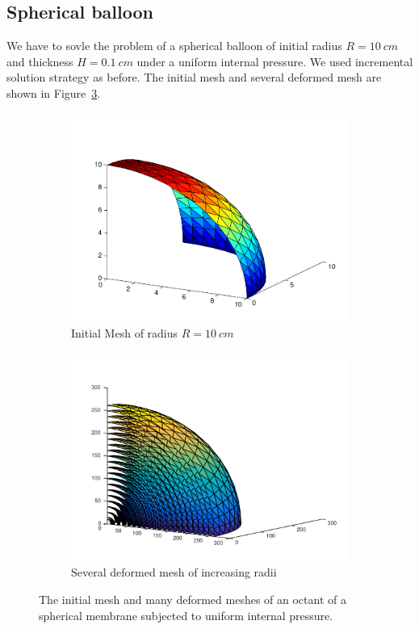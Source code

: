 \documentclass[../main.tex]{subfiles}
\begin{document}
\subsection{Spherical balloon}
We have to sovle the problem of a spherical balloon of initial radius
$R=10\ cm$ and thickness $H = 0.1\ cm$ under a uniform internal
pressure. We used incremental solution strategy as before. The initial
mesh and several deformed mesh are shown in
Figure~\ref{fig:balloonMesh}.
\begin{figure}[ht]
  \centering
  \begin{subfigure}[b]{0.5\textwidth}
    \includegraphics[scale=0.5]{./img/balloon.pdf}
    \caption{Initial Mesh of radius $R=10\ cm$}
    \label{fig:initialBalloon}
  \end{subfigure}%
  \begin{subfigure}[b]{0.5\textwidth}
    \includegraphics[scale=0.5]{./img/balloonBlowingUp2.pdf}
    \caption{Several deformed mesh of increasing radii}
    \label{fig:deformedBalloons}
  \end{subfigure}
  \caption{The initial mesh and many deformed meshes of an octant of a
    spherical membrane subjected to uniform internal pressure.}
  \label{fig:balloonMesh}
\end{figure}
\end{document}
